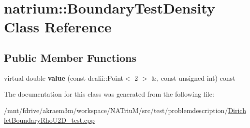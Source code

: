 \hypertarget{classnatrium_1_1BoundaryTestDensity}{
\section{natrium::BoundaryTestDensity Class Reference}
\label{classnatrium_1_1BoundaryTestDensity}
}
\subsection*{Public Member Functions}
\begin{DoxyCompactItemize}
\item 
\hypertarget{classnatrium_1_1BoundaryTestDensity_af485f34989fac863e20d1827f379cfa6}{
virtual double {\bfseries value} (const dealii::Point$<$ 2 $>$ \&, const unsigned int) const }
\label{classnatrium_1_1BoundaryTestDensity_af485f34989fac863e20d1827f379cfa6}

\end{DoxyCompactItemize}


The documentation for this class was generated from the following file:\begin{DoxyCompactItemize}
\item 
/mnt/fdrive/akraem3m/workspace/NATriuM/src/test/problemdescription/\hyperlink{DirichletBoundaryRhoU2D__test_8cpp}{DirichletBoundaryRhoU2D\_\-test.cpp}\end{DoxyCompactItemize}

